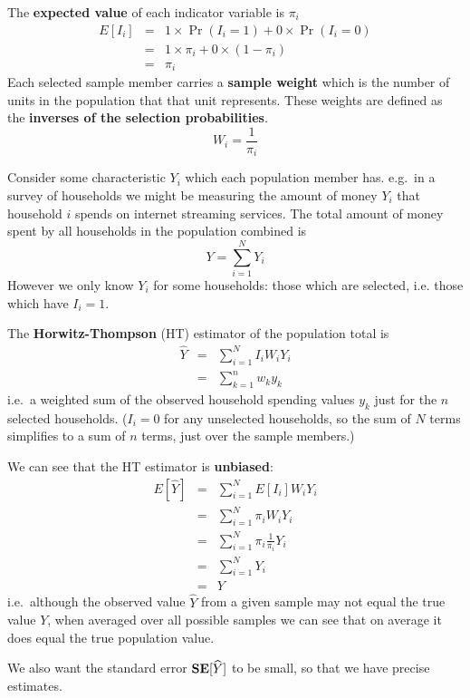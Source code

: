 \documentclass[
]{book}
\newcommand{\bfa}[2]{{\rm\bf #1}[#2]}
\begin{document}
The \textbf{expected value} of each indicator variable is \(\pi_i\)
\begin{eqnarray}
    E[I_i] &=& 1\times\Pr(I_i=1) + 0\times\Pr(I_i=0)\\
           &=& 1\times\pi_i + 0\times(1-\pi_i)\\
           &=& \pi_i
\end{eqnarray}
Each selected sample member carries a \textbf{sample weight} which is the number of units
in the population that that unit represents. These weights are defined as the
\textbf{inverses of the selection probabilities}.
\[
   W_i = \frac{1}{\pi_i}
\]

Consider some characteristic \(Y_i\) which each population member has. e.g.~in a
survey of households we might be measuring the amount of money \(Y_i\) that household
\(i\) spends on internet streaming services. The total amount of money spent by
all households in the population combined is
\[
   Y = \sum_{i=1}^N Y_i
\]
However we only know \(Y_i\) for some households: those which are selected, i.e.
those which have \(I_i=1\).

The \textbf{Horwitz-Thompson} (HT) estimator of the population total is
\begin{eqnarray}
  \widehat{Y} &=& \sum_{i=1}^N I_i W_i Y_i\\
              &=& \sum_{k=1}^n w_k y_k
\end{eqnarray}
i.e.~a weighted sum of the observed household spending values \(y_k\) just for the \(n\)
selected households. (\(I_i=0\) for any unselected households, so the sum of \(N\) terms
simplifies to a sum of \(n\) terms, just over the sample members.)

We can see that the HT estimator is \textbf{unbiased}:
\begin{eqnarray}
  E[\widehat{Y}] &=& \sum_{i=1}^N E[I_i] W_i Y_i\\
                 &=& \sum_{i=1}^N \pi_i W_i Y_i\\
                 &=& \sum_{i=1}^N \pi_i \frac{1}{\pi_i} Y_i\\
                 &=& \sum_{i=1}^N Y_i\\
                 &=& Y
\end{eqnarray}
i.e.~although the observed value \(\widehat{Y}\) from a given sample may not equal the
true value \(Y\), when averaged over all possible samples we can see that on average
it does equal the true population value.

We also want the standard error \(\bfa{SE}{\widehat{Y}}\) to be small, so that we have
precise estimates.
\end{document}
